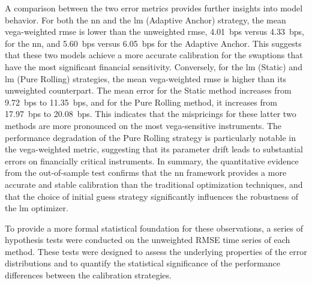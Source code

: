 A comparison between the two error metrics provides further insights into model behavior. For both the \ac{nn} and the \ac{lm} (Adaptive Anchor) strategy, the mean vega-weighted \ac{rmse} is lower than the unweighted \ac{rmse}, 4.01~\ac{bps} versus 4.33~\ac{bps}, for the \ac{nn}, and 5.60~\ac{bps} versus 6.05~\ac{bps} for the Adaptive Anchor. This suggests that these two models achieve a more accurate calibration for the swaptions that have the most significant financial sensitivity. Conversely, for the \ac{lm} (Static) and \ac{lm} (Pure Rolling) strategies, the mean vega-weighted \ac{rmse} is higher than its unweighted counterpart. The mean error for the Static method increases from 9.72~\ac{bps} to 11.35~\ac{bps}, and for the Pure Rolling method, it increases from 17.97~\ac{bps} to 20.08~\ac{bps}. This indicates that the mispricings for these latter two methods are more pronounced on the most vega-sensitive instruments. The performance degradation of the Pure Rolling strategy is particularly notable in the vega-weighted metric, suggesting that its parameter drift leads to substantial errors on financially critical instruments. In summary, the quantitative evidence from the out-of-sample test confirms that the \ac{nn} framework provides a more accurate and stable calibration than the traditional optimization techniques, and that the choice of initial guess strategy significantly influences the robustness of the \ac{lm} optimizer.

To provide a more formal statistical foundation for these observations, a series of hypothesis tests were conducted on the unweighted RMSE time series of each method. These tests were designed to assess the underlying properties of the error distributions and to quantify the statistical significance of the performance differences between the calibration strategies.

